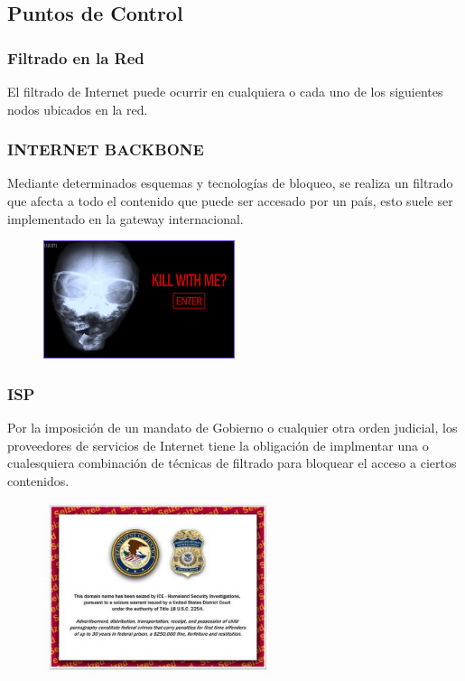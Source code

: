 \documentclass{beamer}
\begin{document}
\subsection{Puntos de Control}
\frame
{
\transdissolve[duration=0.2]
\frametitle{Filtrado en la Red}
El filtrado de Internet puede ocurrir en cualquiera o cada uno de los siguientes nodos ubicados en la red.
}

\frame
{
\transdissolve[duration=0.2]
\frametitle{INTERNET BACKBONE}
Mediante determinados esquemas y tecnolog\'ias de bloqueo, se realiza un filtrado que afecta a todo el contenido que puede ser accesado por un pa\'is, esto suele ser implementado en la gateway internacional.
\begin{figure}
  \centering
    \includegraphics[width=0.5\textwidth]{cens_pop_4.jpg}
  \label{fig:ejemplo}
\end{figure}
}

\frame
{
\transdissolve[duration=0.2]
\frametitle{ISP}
Por la imposici\'on de un mandato de Gobierno o cualquier otra orden judicial, los proveedores de servicios de Internet tiene la obligaci\'on de implmentar una o cualesquiera combinaci\'on de t\'ecnicas de filtrado para bloquear el acceso a ciertos contenidos.
\begin{figure}
  \centering
    \includegraphics[width=0.6\textwidth]{bloq_int.jpg}
  \label{fig:ejemplo}
\end{figure}
}
\end{document}
